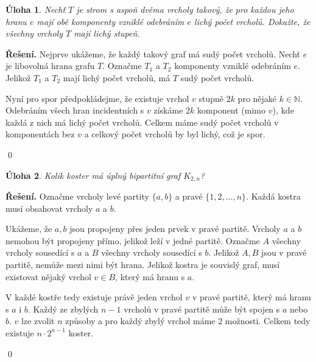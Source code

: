 \documentclass{article}
\newtheorem{uloha}{Úloha}
\newcommand{\N}{\mathbb{N}}
\newenvironment{reseni}{\noindent\textbf{Řešení.}\hspace{0.5em}}{\hfill\qed\medskip}
\begin{document}
\begin{uloha}
Nechť $T$ je strom s aspoň dvěma vrcholy takový, že pro každou jeho hranu $e$ mají obě komponenty vzniklé odebráním $e$ lichý počet vrcholů. Dokažte, že všechny vrcholy $T$ mají lichý stupeň.
\end{uloha}
\begin{reseni}
Nejprve ukážeme, že každý takový graf má sudý počet vrcholů. Nechť $e$ je libovolná hrana grafu $T$. Označme $T_1$ a $T_2$ komponenty vzniklé odebráním $e$. Jelikož $T_1$ a $T_2$ mají lichý počet vrcholů, má $T$ sudý počet vrcholů.

Nyní pro spor předpokládejme, že existuje vrchol $v$ stupně $2k$ pro nějaké $k \in \N$. 
Odebráním všech hran incidentních s $v$ získáme $2k$ komponent (mimo $v$), kde každá z nich má lichý počet vrcholů. 
Celkem máme sudý počet vrcholů v komponentách bez $v$ a celkový počet vrcholů by byl lichý, což je spor.

\end{reseni}
\begin{uloha}
Kolik koster má úplný bipartitní graf $K_{2,n}$?
\end{uloha}
\begin{reseni}
Označme vrcholy levé partity $\{a, b\}$ a pravé $\{1, 2, \dots, n\}$. Každá kostra musí obsahovat
vrcholy $a$ a $b$. 

Ukážeme, že $a, b$ jsou propojeny přes jeden prvek v pravé partitě.
Vrcholy $a$ a $b$ nemohou být propojeny přímo, jelikož leží v jedné partitě.
Označme $A$ všechny vrcholy sousedící s $a$ a $B$ všechny vrcholy sousedící s $b$.
Jelikož $A, B$ jsou v pravé partitě, nemůže mezi nimi být hrana. Jelikož kostra je souvislý graf, musí existovat
nějaký vrchol $v \in B$, který má hranu s $a$.

V každé kostře tedy existuje právě jeden vrchol $v$ v pravé partitě, který má hranu s $a$ i $b$.
Každý ze zbylých $n-1$ vrcholů v pravé partitě může být spojen s $a$ nebo $b$.
$v$ lze zvolit $n$ způsoby a pro každý zbylý vrchol máme $2$ možnosti.
Celkem tedy existuje $n\cdot2^{n-1}$ koster.

\end{reseni}
\end{document}
